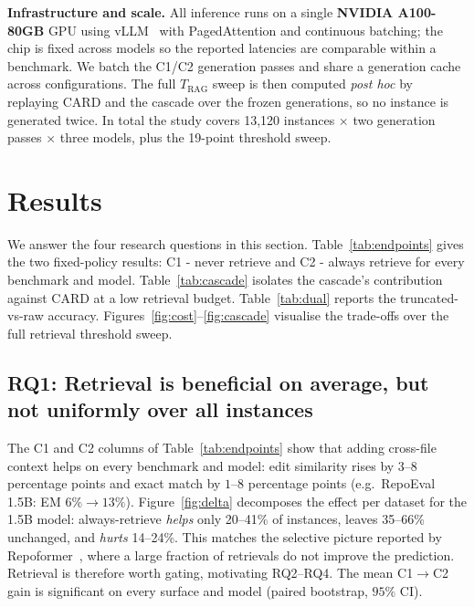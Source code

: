 \documentclass[10pt,conference]{IEEEtran}
\newcommand{\ugr}[1]{{\color{revgreen}#1}}
\newcommand{\sugg}[1]{{\color{suggviolet}#1}}
\begin{document}
\textbf{Infrastructure and scale.} All inference runs on a single
\textbf{NVIDIA A100-80GB} GPU using
vLLM~\cite{kwon2023vllm} with PagedAttention and continuous batching; the chip is
fixed across models so the reported latencies are comparable within a benchmark.
We batch the C1/C2 generation passes and share a generation cache across
configurations. The full $T_{\text{RAG}}$ sweep is then computed \emph{post hoc} by
replaying CARD and the cascade over the frozen generations, so no instance is
generated twice. In total the study covers 13{,}120 instances $\times$ two
generation passes $\times$ three models, plus the 19-point threshold sweep.

\section{Results}
\label{sec:results}

We answer the four research questions in this section. Table~\ref{tab:endpoints} gives the
two fixed-policy results: C1 - never retrieve and C2 - always retrieve for every
benchmark and model. Table~\ref{tab:cascade} isolates the cascade's contribution
against CARD at a low retrieval budget. Table~\ref{tab:dual} reports the
truncated-vs-raw accuracy. Figures~\ref{fig:cost}--\ref{fig:cascade} visualise the
trade-offs over the full retrieval threshold sweep.

\begin{table}[tb]
\caption{Endpoints: C1 (never retrieve) vs.\ C2 (always retrieve), headline
(truncated) scoring. ES/EM/idF1 higher is better; $h_{A4B2}$ (invented-identifier
rate) lower is better. Note
that \ugr{C2 lifts accuracy yet $h_{A4B2}$ \emph{rises} under
C2 in every setting: retrieval does not fix
invented identifiers --- it amplifies them.} \sugg{All C1$\rightarrow$C2 ES gains
are significant (paired bootstrap, $95\%$ CI excludes $0$).}}
\label{tab:endpoints}
\centering\footnotesize

\end{table}

\subsection{RQ1: Retrieval is beneficial on average, but not  uniformly over all instances}
\ugr{The C1 and C2 columns of Table~\ref{tab:endpoints} show that adding
cross-file context helps on every benchmark and model: edit
similarity rises by $3$--$8$ percentage points and exact match by $1$--$8$ percentage points (e.g.\
RepoEval 1.5B: EM $6\%\rightarrow13\%$). Figure~\ref{fig:delta} decomposes the effect per dataset for the 1.5B model: always-retrieve
\emph{helps} only 20--41\% of instances, leaves 35--66\% unchanged,
and \emph{hurts} 14--24\%. This matches the selective picture reported
by Repoformer~\cite{wu2024repoformer}, where a large fraction of retrievals do
not improve the prediction. Retrieval is therefore worth gating,
motivating RQ2--RQ4.} \sugg{The mean C1$\rightarrow$C2 gain is significant on every
surface and model (paired bootstrap, $95\%$ CI).}
\end{document}
